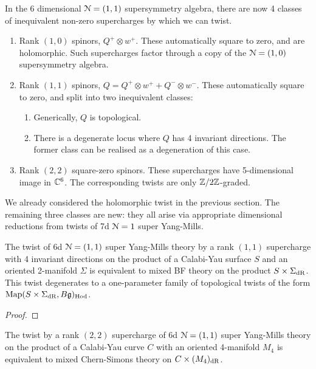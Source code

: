 \documentclass[10pt, oneside]{article}
\begin{document}
In the 6 dimensional $\mathcal{N}=(1,1)$ supersymmetry algebra, there are now 4 classes of inequivalent non-zero supercharges by which we can twist.
\begin{enumerate}
 \item Rank $(1,0)$ spinors, $Q^+ \otimes w^+$.  These automatically square to zero, and are holomorphic.  Such supercharges factor through a copy of the $\mathcal{N}=(1,0)$ supersymmetry algebra.
 \item Rank $(1,1)$ spinors, $Q = Q^+ \otimes w^+ + Q^- \otimes w^-$.  These automatically square to zero, and split into two inequivalent classes:
 \begin{enumerate}
 \item Generically, $Q$ is topological.
 \item There is a degenerate locus where $Q$ has 4 invariant directions.  The former class can be realised as a degeneration of this case.
 \end{enumerate}
 \item Rank $(2,2)$ square-zero spinors.  These supercharges have 5-dimensional image in $\mathbb C^6$.  The corresponding twists are only $\mathbb Z/2\mathbb Z$-graded.
\end{enumerate}

We already considered the holomorphic twist in the previous section.  The remaining three classes are new: they all arise via appropriate dimensional reductions from twists of 7d $\mathcal{N}=1$ super Yang-Mills.

\begin{theorem} \label{6d_rk11_twist_thm}
The twist of 6d $\mathcal{N}=(1,1)$ super Yang-Mills theory by a rank $(1,1)$ supercharge with 4 invariant directions on the product of a Calabi-Yau surface $S$ and an oriented 2-manifold $\Sigma$ is equivalent to mixed BF theory on the product $S \times \Sigma_{\mathrm{dR}}$. This twist degenerates to a one-parameter family of topological twists of the form $\operatorname{Map}(S \times \Sigma_{\mathrm{dR}}, B\mathfrak{g})_{\mathrm{Hod}}$.
\end{theorem}

\begin{proof}
 
\end{proof}

\begin{theorem} \label{6d_rk22_twist_thm}
The twist by a rank $(2,2)$ supercharge of 6d $\mathcal{N}=(1,1)$ super Yang-Mills theory on the product of a Calabi-Yau curve $C$ with an oriented 4-manifold $M_4$ is equivalent to mixed Chern-Simons theory on $C \times (M_4)_{\mathrm{dR}}$.
\end{theorem}
\end{document}
